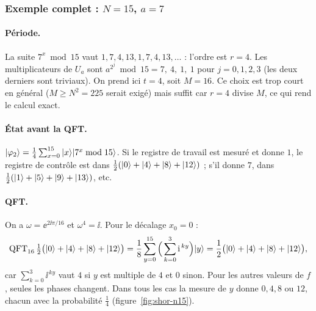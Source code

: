 \subsubsection{Exemple complet : $N=15$, $a=7$}

\paragraph{Période.} La suite $7^x\bmod15$ vaut $1,7,4,13,1,7,4,13,\ldots$ : l'ordre est $r=4$. Les
multiplicateurs de $U_a$ sont $a^{2^j}\bmod 15=7,\ 4,\ 1,\ 1$ pour $j=0,1,2,3$ (les deux derniers sont triviaux).
On prend ici $t=4$, soit $M=16$. Ce choix est trop court en général ($M\geq N^2=225$ serait exigé) mais suffit
car $r=4$ divise $M$, ce qui rend le calcul exact.

\paragraph{État avant la QFT.} $|\varphi_2\rangle=\frac14\sum_{x=0}^{15}|x\rangle|7^x\bmod15\rangle$. Si le
registre de travail est mesuré et donne $1$, le registre de contrôle est dans $\frac12(|0\rangle+|4\rangle+|8\rangle+|12\rangle)$ ;
s'il donne $7$, dans $\frac12(|1\rangle+|5\rangle+|9\rangle+|13\rangle)$, etc.

\paragraph{QFT.} On a $\omega=\ee^{2\ii\pi/16}$ et $\omega^4=\ii$. Pour le décalage $x_0=0$ :
\[
  \mathrm{QFT}_{16}\,\tfrac12\big(|0\rangle+|4\rangle+|8\rangle+|12\rangle\big)
  =\frac18\sum_{y=0}^{15}\Big(\sum_{k=0}^{3}\mathrm{i}^{\,ky}\Big)|y\rangle
  =\frac12\big(|0\rangle+|4\rangle+|8\rangle+|12\rangle\big),
\]
car $\sum_{k=0}^{3}\ii^{\,ky}$ vaut $4$ si $y$ est multiple de $4$ et $0$ sinon. Pour les autres valeurs de
$f$, seules les phases changent. Dans tous les cas la mesure de $y$ donne $0,4,8$ ou $12$, chacun avec la probabilité $\frac14$
(figure~\ref{fig:shor-n15}).

